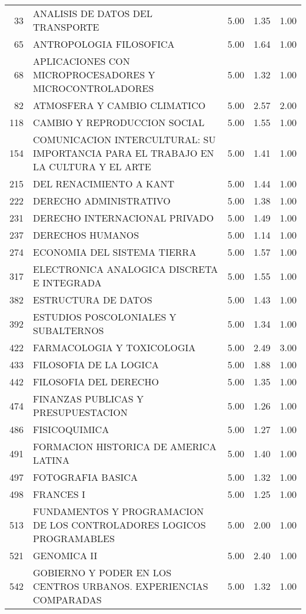 \documentclass[12pt]{article}
\begin{document}
\begin{table}[ht]
\begin{tabular}{rlrrr}
  33 & ANALISIS DE DATOS DEL TRANSPORTE & 5.00 & 1.35 & 1.00 \\ 
  65 & ANTROPOLOGIA FILOSOFICA & 5.00 & 1.64 & 1.00 \\ 
  68 & APLICACIONES CON MICROPROCESADORES Y MICROCONTROLADORES & 5.00 & 1.32 & 1.00 \\ 
  82 & ATMOSFERA Y CAMBIO CLIMATICO & 5.00 & 2.57 & 2.00 \\ 
  118 & CAMBIO Y REPRODUCCION SOCIAL & 5.00 & 1.55 & 1.00 \\ 
  154 & COMUNICACION INTERCULTURAL: SU IMPORTANCIA PARA EL TRABAJO EN LA CULTURA Y EL ARTE & 5.00 & 1.41 & 1.00 \\ 
  215 & DEL RENACIMIENTO A KANT & 5.00 & 1.44 & 1.00 \\ 
  222 & DERECHO ADMINISTRATIVO & 5.00 & 1.38 & 1.00 \\ 
  231 & DERECHO INTERNACIONAL PRIVADO & 5.00 & 1.49 & 1.00 \\ 
  237 & DERECHOS HUMANOS & 5.00 & 1.14 & 1.00 \\ 
  274 & ECONOMIA DEL SISTEMA TIERRA & 5.00 & 1.57 & 1.00 \\ 
  317 & ELECTRONICA ANALOGICA DISCRETA E INTEGRADA & 5.00 & 1.55 & 1.00 \\ 
  382 & ESTRUCTURA DE DATOS & 5.00 & 1.43 & 1.00 \\ 
  392 & ESTUDIOS POSCOLONIALES Y SUBALTERNOS & 5.00 & 1.34 & 1.00 \\ 
  422 & FARMACOLOGIA Y TOXICOLOGIA & 5.00 & 2.49 & 3.00 \\ 
  433 & FILOSOFIA DE LA LOGICA & 5.00 & 1.88 & 1.00 \\ 
  442 & FILOSOFIA DEL DERECHO & 5.00 & 1.35 & 1.00 \\ 
  474 & FINANZAS PUBLICAS Y PRESUPUESTACION & 5.00 & 1.26 & 1.00 \\ 
  486 & FISICOQUIMICA & 5.00 & 1.27 & 1.00 \\ 
  491 & FORMACION HISTORICA DE AMERICA LATINA & 5.00 & 1.40 & 1.00 \\ 
  497 & FOTOGRAFIA BASICA & 5.00 & 1.32 & 1.00 \\ 
  498 & FRANCES I & 5.00 & 1.25 & 1.00 \\ 
  513 & FUNDAMENTOS Y PROGRAMACION DE LOS CONTROLADORES LOGICOS PROGRAMABLES & 5.00 & 2.00 & 1.00 \\ 
  521 & GENOMICA II & 5.00 & 2.40 & 1.00 \\ 
  542 & GOBIERNO Y PODER EN LOS CENTROS URBANOS. EXPERIENCIAS COMPARADAS & 5.00 & 1.32 & 1.00 \\ 

\end{tabular}
\end{table}
\end{document}
